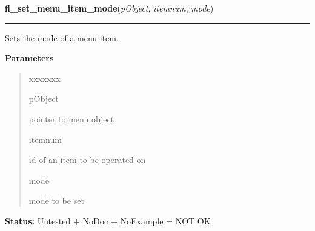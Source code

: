 \hspace{.8\funcindent}\begin{boxedminipage}{\funcwidth}

    \raggedright \textbf{fl\_set\_menu\_item\_mode}(\textit{pObject}, \textit{itemnum}, \textit{mode})

    \vspace{-1.5ex}

    \rule{\textwidth}{0.5\fboxrule}
\setlength{\parskip}{2ex}
    Sets the mode of a menu item.

\setlength{\parskip}{1ex}
      \textbf{Parameters}
      \vspace{-1ex}

      \begin{quote}
        \begin{Ventry}{xxxxxxx}

          \item[pObject]

          pointer to menu object

          \item[itemnum]

          id of an item to be operated on

          \item[mode]

          mode to be set

        \end{Ventry}

      \end{quote}

\textbf{Status:} Untested + NoDoc + NoExample = NOT OK



    \end{boxedminipage}

    \label{xformslib:library:fl_show_menu_symbol}

    \vspace{0.5ex}


